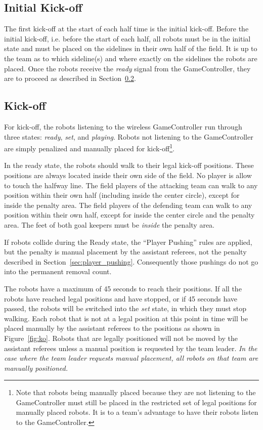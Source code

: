 \documentclass[12pt]{article}
\newcommand{\KickOffAutoTime}{45 seconds\xspace}
\begin{document}
\subsection{Initial Kick-off}
\label{sec:initial-kick-off}

The first kick-off at the start of each half time is the initial kick-off.
Before the initial kick-off, i.e. before the start of each half, all robots must be in the initial state and must be placed on the sidelines in their own half of the field.
It is up to the team as to which sideline(s) and where exactly on the sidelines the robots are placed.
Once the robots receive the \emph{ready} signal from the GameController, they are to proceed as described in Section~\ref{sec:kick-off}.


\subsection{Kick-off}
\label{sec:kick-off}
For kick-off, the robots listening to the wireless GameController run through three states: \emph{ready}, \emph{set}, and \emph{playing}. Robots not listening to the GameController are simply penalized and manually placed for kick-off\footnote{Note that robots being manually placed because they are not listening to the GameController must still be placed in the restricted set of legal positions for manually placed robots. It is to a team's advantage to have their robots listen to the GameController.}.

In the ready state, the robots should walk to their legal kick-off positions. These positions are always located inside their own side of the field. No player is allow to touch the halfway line.
The field players of the attacking team can walk to any position within their own half (including inside the center circle), except for inside the penalty area.
The field players of the defending team can walk to any position within their own half, except for inside the center circle and the penalty area.
The feet of both goal keepers must be \emph{inside} the penalty area.

If robots collide during the Ready state, the ``Player Pushing'' rules are applied, but the penalty is manual placement by the assistant referees, not the penalty described in Section~\ref{sec:player_pushing}.
Consequently those pushings do not go into the permanent removal count.

The robots have a maximum of \KickOffAutoTime to reach their positions. If all the robots have reached legal positions and have stopped, or if \KickOffAutoTime have passed, the robots will be switched into the \emph{set} state, in which they must stop walking. Each robot that is not at a legal position at this point in time will be placed manually by the assistant referees to the positions as shown in Figure~\ref{fig:ko}. Robots that are legally positioned will not be moved by the assistant referees unless a manual position is requested by the team leader.
\emph{In the case where the team leader requests manual placement, all robots on that team are manually positioned.}
\end{document}

